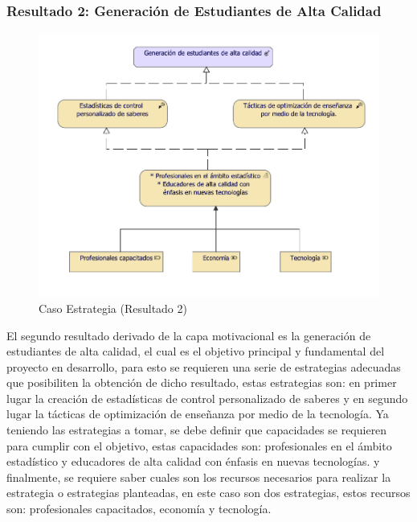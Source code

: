 \clearpage
\subsubsection{Resultado 2: Generación de Estudiantes de Alta Calidad}

\begin{figure}[h!]
	\centering
	\includegraphics[width=.8\linewidth]{imgs/modelo/estrategia/Estrate/EstrategiaResult2.pdf}
	\caption{Caso Estrategia (Resultado 2)}
\end{figure}

El segundo resultado derivado de la capa motivacional es la generación de estudiantes de alta calidad, el cual es el objetivo principal y fundamental del proyecto en desarrollo, para esto se requieren una serie de estrategias adecuadas que posibiliten la obtención de dicho resultado, estas estrategias son: en primer lugar la creación de estadísticas de control personalizado de saberes y en segundo lugar la tácticas de optimización de enseñanza por medio de la tecnología. Ya teniendo las estrategias a tomar, se debe definir que capacidades se requieren para cumplir con el objetivo, estas capacidades son: profesionales en el ámbito estadístico y educadores de alta calidad con énfasis en nuevas tecnologías. y finalmente, se requiere saber cuales son los recursos necesarios para realizar la estrategia o estrategias planteadas, en este caso son dos estrategias, estos recursos son: profesionales capacitados, economía y tecnología.

\clearpage